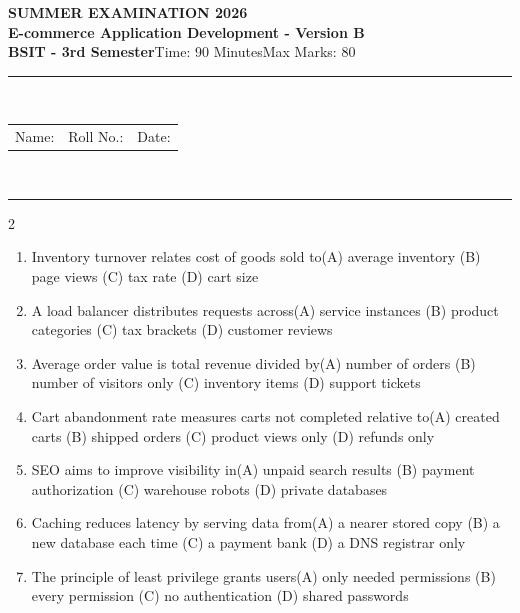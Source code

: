 \documentclass[a4paper]{article}
\makeatletter
\newcommand{\examheader}{%
\begin{center}\textbf{\large SUMMER EXAMINATION 2026}\\[-1pt]
\textbf{\normalsize E-commerce Application Development - Version B}\\[-1pt]
\textbf{BSIT - 3rd Semester}\quad Time: 90 Minutes\quad Max Marks: 80\\[-1pt]
\textcolor{black!65}{\rule{\linewidth}{0.45pt}}\\[-2pt]
\begin{tabularx}{\linewidth}{@{}X X X@{}}Name: \hrulefill & Roll No.: \hrulefill & Date: \hrulefill\end{tabularx}\\[-1pt]
\textcolor{black!65}{\rule{\linewidth}{0.45pt}}\end{center}}
\makeatother
\begin{document}
\examheader
\raggedcolumns
\begin{multicols*}{2}
\fontsize{8.5}{10}\selectfont
\begin{enumerate}
\item Inventory turnover relates cost of goods sold to\newline\hspace*{0.6em}(A) average inventory \quad (B) page views \newline\hspace*{0.6em}(C) tax rate \quad (D) cart size
\item A load balancer distributes requests across\newline\hspace*{0.6em}(A) service instances \quad (B) product categories \newline\hspace*{0.6em}(C) tax brackets \quad (D) customer reviews
\item Average order value is total revenue divided by\newline\hspace*{0.6em}(A) number of orders \quad (B) number of visitors only \newline\hspace*{0.6em}(C) inventory items \quad (D) support tickets
\item Cart abandonment rate measures carts not completed relative to\newline\hspace*{0.6em}(A) created carts \quad (B) shipped orders \newline\hspace*{0.6em}(C) product views only \quad (D) refunds only
\item SEO aims to improve visibility in\newline\hspace*{0.6em}(A) unpaid search results \quad (B) payment authorization \newline\hspace*{0.6em}(C) warehouse robots \quad (D) private databases
\item Caching reduces latency by serving data from\newline\hspace*{0.6em}(A) a nearer stored copy \quad (B) a new database each time \newline\hspace*{0.6em}(C) a payment bank \quad (D) a DNS registrar only
\item The principle of least privilege grants users\newline\hspace*{0.6em}(A) only needed permissions \quad (B) every permission \newline\hspace*{0.6em}(C) no authentication \quad (D) shared passwords

\end{enumerate}
\end{multicols*}
\end{document}
